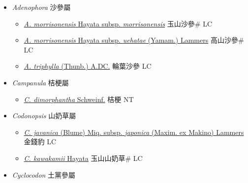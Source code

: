 
  \begin{itemize}
 \item[] \textit{Adenophora} 沙參屬
                    
  \begin{itemize}
        \item[] \href{http://www.theplantlist.org/tpl1.1/search?q=Adenophora+morrisonensis+subsp.+morrisonensis}{\textit{A. morrisonensis} Hayata subsp. \textit{morrisonensis}}   玉山沙參\# LC
        \item[] \href{http://www.theplantlist.org/tpl1.1/search?q=Adenophora+morrisonensis+subsp.+uehatae}{\textit{A. morrisonensis} Hayata subsp. \textit{uehatae} (Yamam.) Lammers}   高山沙參\# LC
        \item[] \href{http://www.theplantlist.org/tpl1.1/search?q=Adenophora+triphylla}{\textit{A. triphylla} (Thunb.) A.DC.}   輪葉沙參 LC
  \end{itemize}
 \item[] \textit{Campanula} 桔梗屬
                    
  \begin{itemize}
        \item[] \href{http://www.theplantlist.org/tpl1.1/search?q=Campanula+dimorphantha}{\textit{C. dimorphantha} Schweinf.}   桔梗 NT
  \end{itemize}
 \item[] \textit{Codonopsis} 山奶草屬
                    
  \begin{itemize}
        \item[] \href{http://www.theplantlist.org/tpl1.1/search?q=Codonopsis+javanica+subsp.+japonica}{\textit{C. javanica} (Blume) Miq. subsp. \textit{japonica} (Maxim. ex Makino) Lammers}   金錢豹 LC
        \item[] \href{http://www.theplantlist.org/tpl1.1/search?q=Codonopsis+kawakamii}{\textit{C. kawakamii} Hayata}   玉山山奶草\# LC
  \end{itemize}
 \item[] \textit{Cyclocodon} 土黨參屬
                    

\end{itemize}
